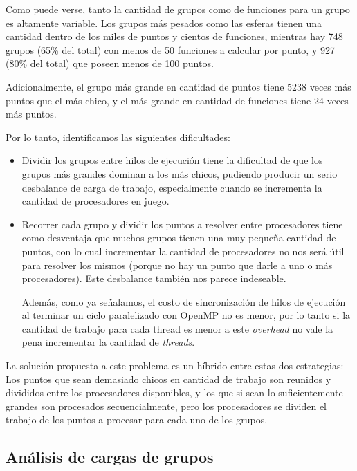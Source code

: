 Como puede verse, tanto la cantidad de grupos como de funciones para un grupo es altamente
variable. Los grupos m\'as pesados como las esferas tienen una cantidad dentro de los
miles de puntos y cientos de funciones, mientras hay 748 grupos (65\%
del total) con menos de 50 funciones a calcular por punto, y 927 (80\% del total)
que poseen menos de 100 puntos.

Adicionalmente, el grupo m\'as grande en cantidad de puntos tiene 5238 veces m\'as
puntos que el m\'as chico, y el m\'as grande en cantidad de funciones tiene 24
veces m\'as puntos.

Por lo tanto, identificamos las siguientes dificultades:

\begin{itemize}
    \item Dividir los grupos entre hilos de ejecuci\'on tiene la dificultad de que
    los grupos m\'as grandes dominan a los m\'as chicos, pudiendo producir un serio
    desbalance de carga de trabajo, especialmente cuando se incrementa la cantidad de
    procesadores en juego.

    \item Recorrer cada grupo y dividir los puntos a resolver entre procesadores
    tiene como desventaja que muchos grupos tienen una muy peque\~na cantidad de
    puntos, con lo cual incrementar la cantidad de procesadores no nos ser\'a \'util
    para resolver los mismos (porque no hay un punto que darle a uno o m\'as procesadores).
    Este desbalance tambi\'en nos parece indeseable.

    Adem\'as, como ya se\~nalamos, el costo de sincronizaci\'on de hilos de
    ejecuci\'on al terminar un ciclo paralelizado con OpenMP no es menor, por
    lo tanto si la cantidad de trabajo para cada thread es menor a este
    \textit{overhead} no vale la pena incrementar la cantidad de \textit{threads}.
\end{itemize}

La soluci\'on propuesta a este problema es un h\'ibrido entre estas dos
estrategias: Los puntos que sean demasiado chicos en cantidad de trabajo son
reunidos y divididos entre los procesadores disponibles, y los que si sean lo
suficientemente grandes son procesados secuencialmente, pero los procesadores se
dividen el trabajo de los puntos a procesar para cada uno de los grupos.

\subsection{An\'alisis de cargas de grupos}
\label{PredictorCPU}

